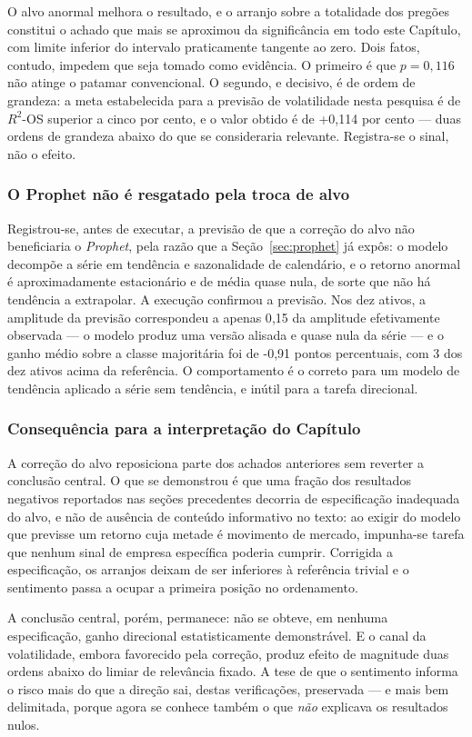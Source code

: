 O alvo anormal melhora o resultado, e o arranjo sobre a totalidade dos pregões constitui o achado
que mais se aproximou da significância em todo este Capítulo, com limite inferior do intervalo
praticamente tangente ao zero. Dois fatos, contudo, impedem que seja tomado como evidência. O
primeiro é que $p = 0{,}116$ não atinge o patamar convencional. O segundo, e decisivo, é de ordem de
grandeza: a meta estabelecida para a previsão de volatilidade nesta pesquisa é de $R^2$-OS superior
a cinco por cento, e o valor obtido é de +0{,}114 por cento --- duas ordens de grandeza abaixo do que se
consideraria relevante. Registra-se o sinal, não o efeito.

\subsubsection{O Prophet não é resgatado pela troca de alvo}

Registrou-se, antes de executar, a previsão de que a correção do alvo não beneficiaria o
\textit{Prophet}, pela razão que a Seção~\ref{sec:prophet} já expôs: o modelo decompõe a série em
tendência e sazonalidade de calendário, e o retorno anormal é aproximadamente estacionário e de
média quase nula, de sorte que não há tendência a extrapolar. A execução confirmou a previsão. Nos
dez ativos, a amplitude da previsão correspondeu a apenas 0{,}15 da amplitude efetivamente
observada --- o modelo produz uma versão alisada e quase nula da série --- e o ganho médio sobre a
classe majoritária foi de -0{,}91 pontos percentuais, com 3 dos dez ativos acima da
referência. O comportamento é o correto para um modelo de tendência aplicado a série sem
tendência, e inútil para a tarefa direcional.

\subsubsection{Consequência para a interpretação do Capítulo}

A correção do alvo reposiciona parte dos achados anteriores sem reverter a conclusão central. O que
se demonstrou é que uma fração dos resultados negativos reportados nas seções precedentes decorria
de especificação inadequada do alvo, e não de ausência de conteúdo informativo no texto: ao exigir
do modelo que previsse um retorno cuja metade é movimento de mercado, impunha-se tarefa que nenhum
sinal de empresa específica poderia cumprir. Corrigida a especificação, os arranjos deixam de ser
inferiores à referência trivial e o sentimento passa a ocupar a primeira posição no ordenamento.

A conclusão central, porém, permanece: não se obteve, em nenhuma especificação, ganho direcional
estatisticamente demonstrável. E o canal da volatilidade, embora favorecido pela correção, produz
efeito de magnitude duas ordens abaixo do limiar de relevância fixado. A tese de que o sentimento
informa o risco mais do que a direção sai, destas verificações, preservada --- e mais bem
delimitada, porque agora se conhece também o que \emph{não} explicava os resultados nulos.
